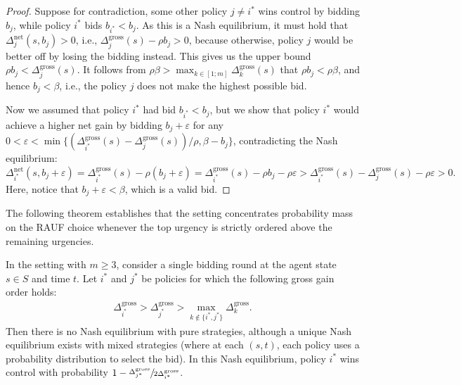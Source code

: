 \begin{proof}
	Suppose for contradiction, some other policy $j\neq i^*$ wins control by bidding $b_j$, while policy $i^*$ bids $b_{i^*}<b_j$. 
	As this is a Nash equilibrium, it must hold that 
	$\Delta_j^{\mathrm{net}}(s,b_j) > 0$, i.e., $ \Delta_j^{\mathrm{gross}}(s) - \rho b_j > 0$,
	because otherwise, policy $j$ would be better off by losing the bidding instead.
	This gives us the upper bound $\rho b_j < \Delta_j^{\mathrm{gross}}(s)$.
	It follows from $\rho\beta > \max_{k\in [1;m]}\Delta_k^{\mathrm{gross}}(s)$ that $\rho b_j < \rho\beta$, and hence $b_j<\beta$, i.e., the policy $j$ does not make the highest possible bid.
	
	Now we assumed that policy $i^*$ had bid $b_{i^*}<b_j$, but we show that policy $i^*$ would achieve a higher net gain by bidding $b_j+\varepsilon$ for any $0<\varepsilon< \min\{ (\Delta^{\mathrm{gross}}_{i^*}(s) - \Delta_j^{\mathrm{gross}}(s))/\rho, \beta-b_j\}$, contradicting the Nash equilibrium:	 
$	\Delta_{i^*}^{\mathrm{net}}(s,b_j+\varepsilon) 
	= \Delta^{\mathrm{gross}}_{i^*}(s) - \rho(b_j+\varepsilon) 
	= \Delta^{\mathrm{gross}}_{i^*}(s) - \rho b_j -\rho\varepsilon  
	> \Delta^{\mathrm{gross}}_{i^*}(s) - \Delta_j^{\mathrm{gross}}(s) -\rho\varepsilon
	> 0.
$
	Here, notice that $b_j+\varepsilon < \beta$, which is a valid bid.
\end{proof}


The following theorem establishes that the \allpay setting concentrates probability mass on the RAUF choice whenever the top urgency is strictly ordered above the remaining urgencies.

\begin{theorem}
	In the \allpay setting with $m\geq 3$, consider a single bidding round at the agent state $s\in S$ and time $t$.
	Let $i^*$ and $j^*$ be policies for which the following gross gain order holds:
	\begin{align}\label{eqn:allpay urgency gap}
		\Delta_{i^*}^{\mathrm{gross}} > \Delta_{j^*}^{\mathrm{gross}} > \max_{k\notin \{i^*,j^*\}}\Delta_k^{\mathrm{gross}}.
	\end{align}
	Then there is no Nash equilibrium with pure strategies, although a unique Nash equilibrium exists with mixed strategies (where at each $(s,t)$, each policy uses a probability distribution to select the bid).
	In this Nash equilibrium, policy $i^*$ wins control with probability $1-\sfrac{\Delta_{j^*}^{\mathrm{gross}}}{2\Delta_{i^*}^{\mathrm{gross}}}$.	
\end{theorem}

